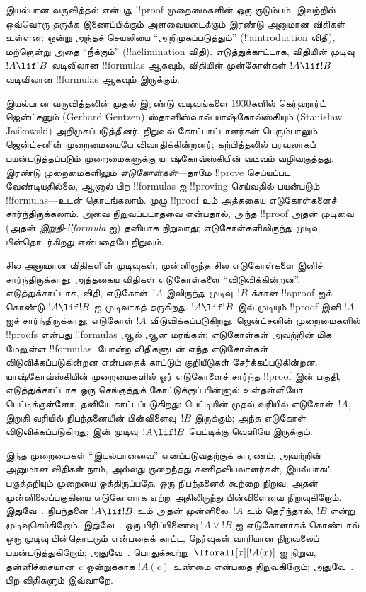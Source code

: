 \documentclass[../../../include/open-logic-section]{subfiles}
\begin{document}


இயல்பான வருவித்தல் என்பது !!{proof} முறைமைகளின் ஒரு குடும்பம்.
இவற்றில் ஒவ்வொரு தருக்க இணைப்பிக்கும் அளவையடைக்கும் இரண்டு அனுமான விதிகள்
உள்ளன: ஒன்று அந்தச் செயலியை ``அறிமுகப்படுத்தும்'' (!!a{introduction} விதி),
மற்றொன்று அதை ``நீக்கும்'' (!!a{elimination} விதி). எடுத்துக்காட்டாக,
\Intro{\lif} விதியின் முடிவு $!A \lif !B$ வடிவிலான !!{formula}s ஆகவும்,
\Elim{\lif} விதியின் முன்கோள்கள் $!A \lif !B$ வடிவிலான
!!{formula}s ஆகவும் இருக்கும்.

இயல்பான வருவித்தலின் முதல் இரண்டு வடிவங்களை 1930களில்
கெர்ஹார்ட் ஜென்ட்சனும் (Gerhard Gentzen) ஸ்தானிஸ்வாவ்
யாஷ்கோவ்ஸ்கியும் (Stanisław Jaśkowski) அறிமுகப்படுத்தினர்.
நிறுவல் கோட்பாட்டாளர்கள் பெரும்பாலும் ஜென்ட்சனின் முறைமையையே
விவாதிக்கின்றனர்; கற்பித்தலில் பரவலாகப் பயன்படுத்தப்படும்
முறைமைகளுக்கு யாஷ்கோவ்ஸ்கியின் வடிவம் வழிவகுத்தது. இரண்டு
முறைமைகளிலும் \emph{எடுகோள்கள்}---தாமே !!{prove} செய்யப்பட
வேண்டியதில்லை, ஆனால் பிற !!{formula}s ஐ !!{proving} செய்வதில்
பயன்படும் !!{formula}s---உடன் தொடங்கலாம். முழு !!{proof} உம்
அத்தகைய எடுகோள்களைச் சார்ந்திருக்கலாம். அவை நிறுவப்படாதவை என்பதால்,
அந்த !!{proof} அதன் முடிவை (அதன் \emph{இறுதி-!!{formula}} ஐ)
தனியாக நிறுவாது; எடுகோள்களிலிருந்து முடிவு பின்தொடர்கிறது என்பதையே
நிறுவும்.

சில அனுமான விதிகளின் முடிவுகள், முன்னிருந்த சில எடுகோள்களை
இனிச் சார்ந்திருக்காது: அத்தகைய விதிகள் எடுகோள்களை
``விடுவிக்கின்றன''. எடுத்துக்காட்டாக, \Intro{\lif} விதி,
எடுகோள்~$!A$ இலிருந்து முடிவு~$!B$ க்கான !!a{proof} ஐக் கொண்டு
$!A \lif !B$ ஐ முடிவாகத் தருகிறது. $!A \lif !B$ இல் முடியும்
!!{proof} இனி $!A$ ஐச் சார்ந்திருக்காது; எடுகோள் $!A$
விடுவிக்கப்படுகிறது. ஜென்ட்சனின் முறைமைகளில் !!{proof}s என்பது
!!{formula}s ஆல் ஆன மரங்கள்; எடுகோள்கள் அவற்றின் மிக மேலுள்ள
!!{formula}s. \Intro{\lif} போன்ற விதிகளுடன் எந்த எடுகோள்கள்
விடுவிக்கப்படுகின்றன என்பதைக் காட்டும் குறியீடுகள் சேர்க்கப்படுகின்றன.
யாஷ்கோவ்ஸ்கியின் முறைமைகளில் ஓர் எடுகோளைச் சார்ந்த !!{proof} இன்
பகுதி, எடுத்துக்காட்டாக ஒரு செங்குத்துக் கோட்டுக்குப் பின்னால்
உள்தள்ளியோ பெட்டிக்குள்ளோ, தனியே காட்டப்படுகிறது: பெட்டியின்
முதல் வரியில் எடுகோள்~$!A$, இறுதி வரியில் நிபந்தனையின்
பின்விளைவு~$!B$ இருக்கும்; அந்த எடுகோள் விடுவிக்கப்படுகிறது;
\Intro{\lif} இன் முடிவு~$!A \lif !B$ பெட்டிக்கு வெளியே இருக்கும்.

இந்த முறைமைகள் ``இயல்பானவை'' எனப்படுவதற்குக் காரணம், அவற்றின்
அனுமான விதிகள் நாம், அல்லது குறைந்தது கணிதவியலாளர்கள்,
இயல்பாகப் பகுத்தறியும் முறையை ஒத்திருப்பதே. ஒரு நிபந்தனைக் கூற்றை
நிறுவ, அதன் முன்னிலைப்பகுதியை எடுகோளாக ஏற்று அதிலிருந்து
பின்விளைவை நிறுவுகிறோம். இதுவே~\Intro{\lif}. நிபந்தனை
$!A \lif !B$ உம் அதன் முன்னிலை~$!A$ உம் தெரிந்தால், $!B$
என்று முடிவுசெய்கிறோம். இதுவே~\Elim{\lif}. ஒரு பிரிப்பிணைவு
$!A \lor !B$ ஐ எடுகோளாகக் கொண்டால் ஒரு முடிவு பின்தொடரும்
என்பதைக் காட்ட, நேர்வுகள் வாரியான நிறுவலைப் பயன்படுத்துகிறோம்;
அதுவே~\Elim{\lor}. பொதுக்கூற்று~$\lforall[x][!A(x)]$ ஐ
நிறுவ, தன்னிச்சையான~$c$ ஒன்றுக்காக $!A(c)$ உண்மை என்பதை
நிறுவுகிறோம்; அதுவே~\Intro{\lforall}. பிற விதிகளும் இவ்வாறே.
\end{document}
